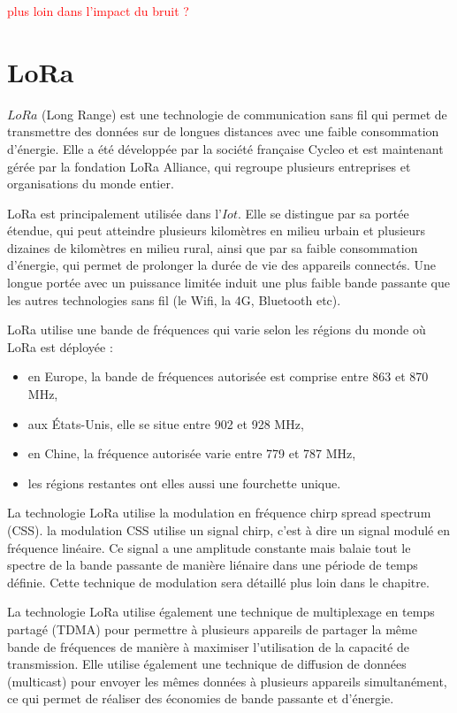 \documentclass[12pt,a4paper,oneside, titlepage]{report}
\begin{document}
\textcolor{red}{plus loin dans l'impact du bruit ?}

\newpage

\section{LoRa}

$LoRa$ (Long Range) est une technologie de communication sans fil qui permet de transmettre des données sur de longues distances avec une faible consommation d'énergie. Elle a été développée par la société française Cycleo et est maintenant gérée par la fondation LoRa Alliance, qui regroupe plusieurs entreprises et organisations du monde entier.

LoRa est principalement utilisée dans l'$Iot$. Elle se distingue par sa portée étendue, qui peut atteindre plusieurs kilomètres en milieu urbain et plusieurs dizaines de kilomètres en milieu rural, ainsi que par sa faible consommation d'énergie, qui permet de prolonger la durée de vie des appareils connectés. Une longue portée avec un puissance limitée induit une plus faible bande passante que les autres technologies sans fil (le Wifi, la 4G, Bluetooth etc).


LoRa utilise une bande de fréquences qui varie selon les régions du monde où LoRa est déployée :
\begin{itemize}
\item en Europe, la bande de fréquences autorisée est comprise entre 863 et 870 MHz,
\item aux États-Unis, elle se situe entre 902 et 928 MHz,
\item en Chine, la fréquence autorisée varie entre 779 et 787 MHz,
\item les régions restantes ont elles aussi une fourchette unique.
\end{itemize}

La technologie LoRa utilise la modulation en fréquence chirp spread spectrum (CSS). la modulation CSS utilise un signal chirp, c'est à dire un signal modulé en fréquence linéaire. Ce signal a une amplitude constante mais balaie tout le spectre de la bande passante de manière liénaire dans une période de temps définie. Cette technique de modulation sera détaillé plus loin dans le chapitre.

La technologie LoRa utilise également une technique de multiplexage en temps partagé (TDMA) pour permettre à plusieurs appareils de partager la même bande de fréquences de manière à maximiser l'utilisation de la capacité de transmission. Elle utilise également une technique de diffusion de données (multicast) pour envoyer les mêmes données à plusieurs appareils simultanément, ce qui permet de réaliser des économies de bande passante et d'énergie.
\end{document}
